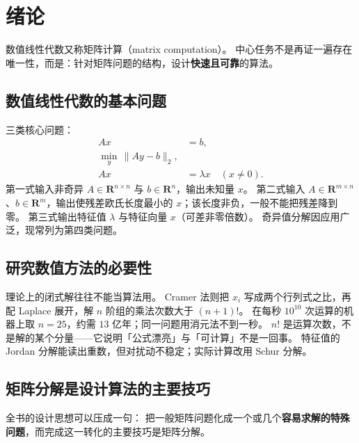 \chapter*{绪论}
\setcounter{section}{0}
\renewcommand{\thesection}{\arabic{section}}

数值线性代数又称矩阵计算（matrix computation）。
中心任务不是再证一遍存在唯一性，而是：针对矩阵问题的结构，设计\textbf{快速且可靠}的算法。

\section{数值线性代数的基本问题}

三类核心问题：
\begin{align}
Ax&=b,\\
\min_y\,\lVert Ay-b\rVert_2,\\
Ax&=\lambda x\quad(x\neq 0).
\end{align}
第一式输入非奇异 $A\in\mathbf{R}^{n\times n}$ 与 $b\in\mathbf{R}^{n}$，输出未知量 $x$。
第二式输入 $A\in\mathbf{R}^{m\times n}$、$b\in\mathbf{R}^{m}$，输出使残差欧氏长度最小的 $x$；该长度非负，一般不能把残差降到零。
第三式输出特征值 $\lambda$ 与特征向量 $x$（可差非零倍数）。
奇异值分解因应用广泛，现常列为第四类问题。

\section{研究数值方法的必要性}

理论上的闭式解往往不能当算法用。
Cramer 法则把 $x_i$ 写成两个行列式之比，再配 Laplace 展开，解 $n$ 阶组的乘法次数大于 $(n+1)!$。
在每秒 $10^{10}$ 次运算的机器上取 $n=25$，约需 $13$ 亿年；同一问题用消元法不到一秒。
$n!$ 是运算次数，不是解的某个分量——它说明「公式漂亮」与「可计算」不是一回事。
特征值的 Jordan 分解能读出重数，但对扰动不稳定；实际计算改用 Schur 分解。

\section{矩阵分解是设计算法的主要技巧}

全书的设计思想可以压成一句：
把一般矩阵问题化成一个或几个\textbf{容易求解的特殊问题}，而完成这一转化的主要技巧是矩阵分解。


